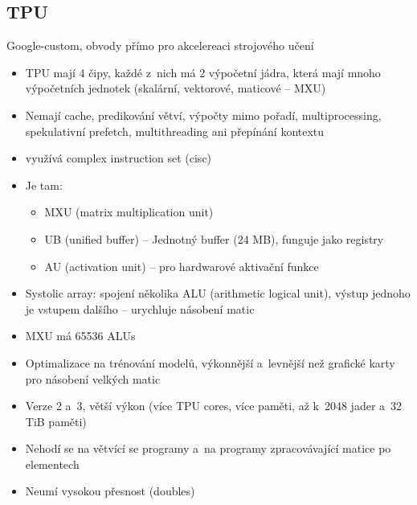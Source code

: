 \subsection{TPU}
Google-custom, obvody přímo pro akcelereaci strojového učení
\begin{itemize}
    \item TPU mají 4 čipy, každé z~nich má 2 výpočetní jádra, která mají mnoho výpočetních jednotek (skalární, vektorové, maticové -- MXU)
    \item Nemají cache, predikování větví, výpočty mimo pořadí, multiprocessing, spekulativní prefetch, multithreading ani přepínání kontextu
    \item využívá complex instruction set (cisc)
    \item Je tam:
    \begin{itemize}
        \item MXU (matrix multiplication unit)
        \item UB (unified buffer) -- Jednotný buffer (24 MB), funguje jako registry
        \item AU (activation unit) -- pro hardwarové aktivační funkce
    \end{itemize}
    \item Systolic array: spojení několika ALU (arithmetic logical unit), výstup jednoho je vstupem dalšího -- urychluje násobení matic
    \item MXU má 65536 ALUs
    \item Optimalizace na trénování modelů, výkonnější a~levnější než grafické karty pro násobení velkých matic
    \item Verze 2 a~3, větší výkon (více TPU cores, více paměti, až k~2048 jader a~32 TiB paměti)
    \item Nehodí se na větvící se programy a~na programy zpracovávající matice po elementech
    \item Neumí vysokou přesnost (doubles)
\end{itemize}
